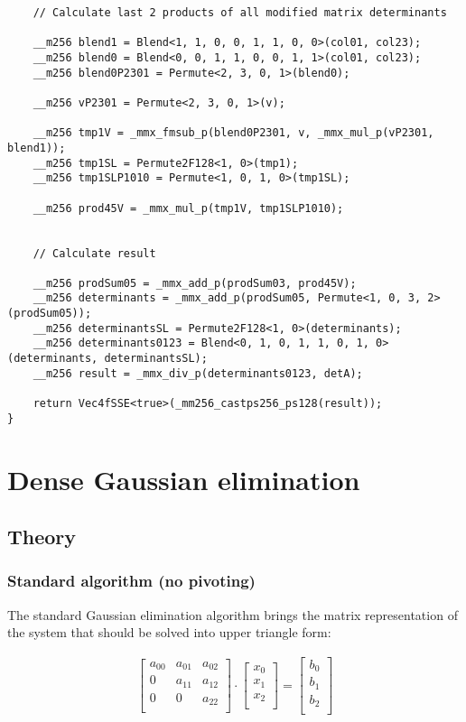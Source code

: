 \documentclass[]{scrartcl}
\begin{document}
\begin{verbatim}
    // Calculate last 2 products of all modified matrix determinants

    __m256 blend1 = Blend<1, 1, 0, 0, 1, 1, 0, 0>(col01, col23);
    __m256 blend0 = Blend<0, 0, 1, 1, 0, 0, 1, 1>(col01, col23);
    __m256 blend0P2301 = Permute<2, 3, 0, 1>(blend0);

    __m256 vP2301 = Permute<2, 3, 0, 1>(v);

    __m256 tmp1V = _mmx_fmsub_p(blend0P2301, v, _mmx_mul_p(vP2301, blend1));
    __m256 tmp1SL = Permute2F128<1, 0>(tmp1);
    __m256 tmp1SLP1010 = Permute<1, 0, 1, 0>(tmp1SL);

    __m256 prod45V = _mmx_mul_p(tmp1V, tmp1SLP1010);


    // Calculate result

    __m256 prodSum05 = _mmx_add_p(prodSum03, prod45V);
    __m256 determinants = _mmx_add_p(prodSum05, Permute<1, 0, 3, 2>(prodSum05));
    __m256 determinantsSL = Permute2F128<1, 0>(determinants);
    __m256 determinants0123 = Blend<0, 1, 0, 1, 1, 0, 1, 0>(determinants, determinantsSL);
    __m256 result = _mmx_div_p(determinants0123, detA);

    return Vec4fSSE<true>(_mm256_castps256_ps128(result));
}
\end{verbatim}


\section{Dense Gaussian elimination}

\subsection{Theory}

\subsubsection{Standard algorithm (no pivoting)}
The standard Gaussian elimination algorithm brings the matrix representation of the system that should be solved into upper triangle form:


\begin{align}
\label{eq:gauss3x3upperTriangle}
\begin{bmatrix}
a_{00}&a_{01}&a_{02}\\
0&a_{11}&a_{12}\\
0&0&a_{22}\\
\end{bmatrix}
\cdot
\begin{bmatrix}
x_0\\
x_1\\
x_2\\
\end{bmatrix}
=
\begin{bmatrix}
b_0\\
b_1\\
b_2\\
\end{bmatrix}
\end{align}
\end{document}
